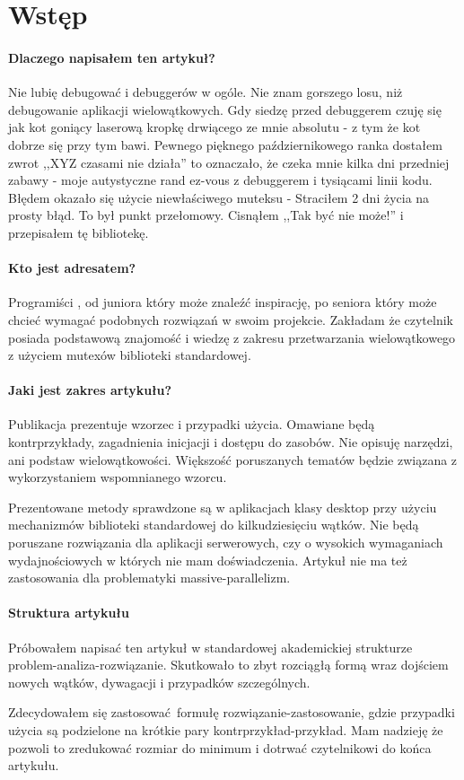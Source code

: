 \section{Wstęp}\label{sec:introduction}
\paragraph{Dlaczego napisałem ten artykuł?}
Nie lubię debugować i debuggerów w ogóle. Nie znam gorszego losu, niż debugowanie aplikacji wielowątkowych. Gdy siedzę przed debuggerem czuję się jak kot goniący laserową kropkę drwiącego ze mnie absolutu - z tym że kot dobrze się przy tym bawi.
Pewnego pięknego październikowego ranka dostałem zwrot ,,XYZ czasami nie działa'' to oznaczało, że czeka mnie kilka dni przedniej zabawy - moje autystyczne rand ez-vous z debuggerem i tysiącami linii kodu. Błędem okazało się użycie niewłaściwego muteksu - Straciłem 2 dni życia na prosty błąd. To był punkt przełomowy. Cisnąłem ,,Tak być nie może!'' i przepisałem tę bibliotekę. 

\paragraph{Kto jest adresatem?}
Programiści \Cpp{}, od juniora który może znaleźć inspirację, po seniora który może chcieć wymagać podobnych rozwiązań w swoim projekcie. Zakładam że czytelnik posiada podstawową znajomość  i wiedzę z zakresu przetwarzania wielowątkowego z użyciem mutexów biblioteki standardowej.

\paragraph{Jaki jest zakres artykułu?}
Publikacja prezentuje wzorzec  i przypadki użycia. Omawiane będą kontrprzykłady, zagadnienia inicjacji i dostępu do zasobów. Nie opisuję narzędzi, ani podstaw wielowątkowości. Większość poruszanych tematów będzie związana z wykorzystaniem wspomnianego wzorcu.

Prezentowane metody sprawdzone są w aplikacjach klasy desktop przy użyciu mechanizmów biblioteki standardowej do kilkudziesięciu wątków. Nie będą poruszane rozwiązania dla aplikacji serwerowych, czy o wysokich wymaganiach wydajnościowych w których nie mam doświadczenia. Artykuł nie ma też zastosowania dla problematyki massive-parallelizm.

\paragraph{Struktura artykułu}
Próbowałem napisać ten artykuł w standardowej akademickiej strukturze problem-analiza-rozwiązanie. Skutkowało to zbyt rozciągłą formą wraz dojściem nowych wątków, dywagacji i przypadków szczególnych.

Zdecydowałem się zastosować formułę rozwiązanie-zastosowanie, gdzie przypadki użycia są podzielone na krótkie pary kontrprzykład-przykład. Mam nadzieję że pozwoli to zredukować rozmiar do minimum i dotrwać czytelnikowi do końca artykułu.
